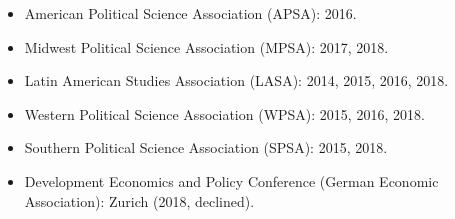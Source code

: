 \begin{itemize}
\item American Political Science Association (APSA): 2016.
\item Midwest Political Science Association (MPSA): 2017, 2018.
\item Latin American Studies Association (LASA): 2014, 2015, 2016, 2018.
\item Western Political Science Association (WPSA): 2015, 2016, 2018.
\item Southern Political Science Association (SPSA): 2015, 2018.
\item Development Economics and Policy Conference (German Economic Association): Zurich (2018, declined).
\end{itemize}
